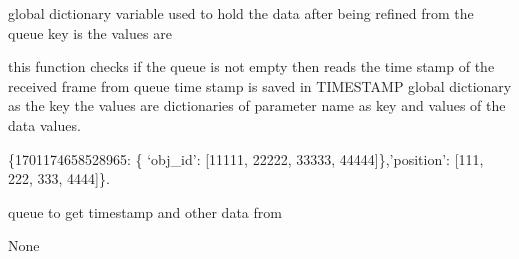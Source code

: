 \documentclass[letterpaper,10pt,english]{sphinxmanual}
\begin{document}
\begin{fulllineitems}
\label{\detokenize{processing:processing.data_processing.TIMESTAMP}}
\pysigstartsignatures
{}
\pysigstopsignatures
\sphinxAtStartPar
global dictionary variable used to hold the data after being refined from the queue
key is the  values are

\end{fulllineitems}


\begin{fulllineitems}
\label{\detokenize{processing:processing.data_processing.get_from_queue}}
\pysigstartsignatures
{}
\pysigstopsignatures\begin{description}
\sphinxAtStartPar
this function checks if the queue is not empty then
reads the time stamp of the received frame from queue
time stamp is saved in TIMESTAMP global dictionary as the key
the values are dictionaries of parameter name as key and values of
the data values.

\sphinxAtStartPar
\{1701174658528965: \{ ‘obj\_id’: {[}11111, 22222, 33333, 44444{]}\},’position’: {[}111, 222, 333, 4444{]}\}.

\sphinxAtStartPar
queue to get timestamp and other data from

\sphinxAtStartPar
None

\end{description}

\end{fulllineitems}

\end{document}
